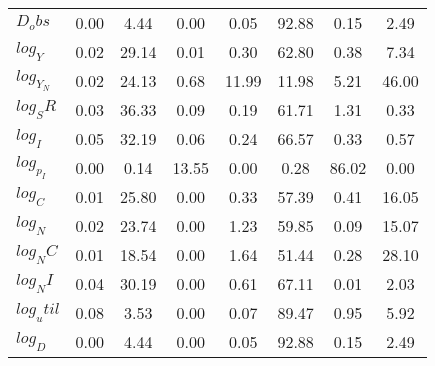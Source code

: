 \begin{center}
\begin{longtable}{lccccccc}
$D_obs     $	 & 	        0.00	 & 	        4.44	 & 	        0.00	 & 	        0.05	 & 	       92.88	 & 	        0.15	 & 	        2.49 \\ 
$log_Y     $	 & 	        0.02	 & 	       29.14	 & 	        0.01	 & 	        0.30	 & 	       62.80	 & 	        0.38	 & 	        7.34 \\ 
$log_Y_N   $	 & 	        0.02	 & 	       24.13	 & 	        0.68	 & 	       11.99	 & 	       11.98	 & 	        5.21	 & 	       46.00 \\ 
$log_SR    $	 & 	        0.03	 & 	       36.33	 & 	        0.09	 & 	        0.19	 & 	       61.71	 & 	        1.31	 & 	        0.33 \\ 
$log_I     $	 & 	        0.05	 & 	       32.19	 & 	        0.06	 & 	        0.24	 & 	       66.57	 & 	        0.33	 & 	        0.57 \\ 
$log_p_I   $	 & 	        0.00	 & 	        0.14	 & 	       13.55	 & 	        0.00	 & 	        0.28	 & 	       86.02	 & 	        0.00 \\ 
$log_C     $	 & 	        0.01	 & 	       25.80	 & 	        0.00	 & 	        0.33	 & 	       57.39	 & 	        0.41	 & 	       16.05 \\ 
$log_N     $	 & 	        0.02	 & 	       23.74	 & 	        0.00	 & 	        1.23	 & 	       59.85	 & 	        0.09	 & 	       15.07 \\ 
$log_NC    $	 & 	        0.01	 & 	       18.54	 & 	        0.00	 & 	        1.64	 & 	       51.44	 & 	        0.28	 & 	       28.10 \\ 
$log_NI    $	 & 	        0.04	 & 	       30.19	 & 	        0.00	 & 	        0.61	 & 	       67.11	 & 	        0.01	 & 	        2.03 \\ 
$log_util  $	 & 	        0.08	 & 	        3.53	 & 	        0.00	 & 	        0.07	 & 	       89.47	 & 	        0.95	 & 	        5.92 \\ 
$log_D     $	 & 	        0.00	 & 	        4.44	 & 	        0.00	 & 	        0.05	 & 	       92.88	 & 	        0.15	 & 	        2.49 \\ 
\end{longtable}
 \end{center}
